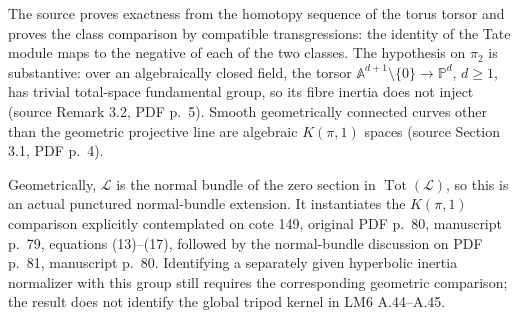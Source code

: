 The source proves exactness from the homotopy sequence of the torus
torsor and proves the class comparison by compatible transgressions:
the identity of the Tate module maps to the negative of each of the
two classes. The hypothesis on $\pi_2$ is substantive: over an
algebraically closed field, the torsor
$\mathbb A^{d+1}\setminus\{0\}\to\mathbb P^d$, $d\ge1$, has trivial
total-space fundamental group, so its fibre inertia does not inject
(source Remark 3.2, PDF p.~5). Smooth geometrically connected curves
other than the geometric projective line are algebraic $K(\pi,1)$
spaces (source Section 3.1, PDF p.~4).

Geometrically, $\mathcal L$ is the normal bundle of the zero section in
$\operatorname{Tot}(\mathcal L)$, so this is an actual punctured
normal-bundle extension. It instantiates the $K(\pi,1)$ comparison
explicitly contemplated on cote 149, original PDF p.~80, manuscript
p.~79, equations (13)--(17), followed by the normal-bundle discussion
on PDF p.~81, manuscript p.~80. Identifying a separately given
hyperbolic inertia normalizer with this group still requires the
corresponding geometric comparison; the result does not identify
the global tripod kernel in LM6 A.44--A.45.

